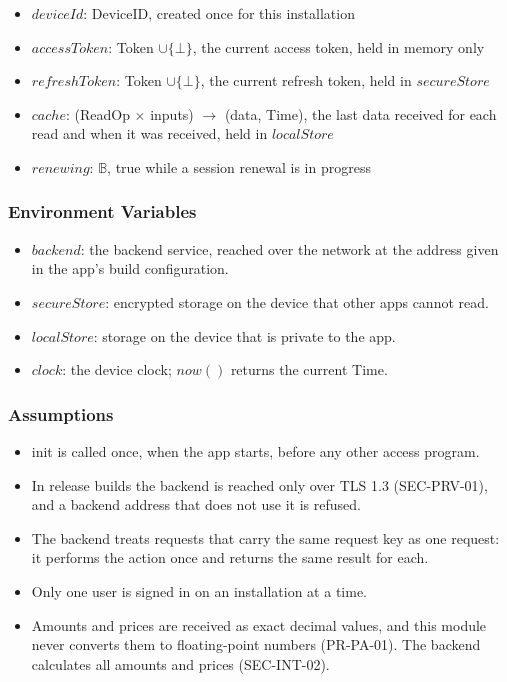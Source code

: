 \documentclass[12pt, titlepage]{article}
\begin{document}
\begin{itemize}
\item $\mathit{deviceId}$: DeviceID, created once for this installation
\item $\mathit{accessToken}$: Token $\cup \{\bot\}$, the current access
  token, held in memory only
\item $\mathit{refreshToken}$: Token $\cup \{\bot\}$, the current refresh
  token, held in $\mathit{secureStore}$
\item $\mathit{cache}$: (ReadOp $\times$ inputs) $\rightarrow$ (data, Time),
  the last data received for each read and when it was received, held in
  $\mathit{localStore}$
\item $\mathit{renewing}$: $\mathbb{B}$, true while a session renewal is in
  progress
\end{itemize}

\subsubsection{Environment Variables}

\begin{itemize}
\item $\mathit{backend}$: the backend service, reached over the network at
  the address given in the app's build configuration.
\item $\mathit{secureStore}$: encrypted storage on the device that other
  apps cannot read.
\item $\mathit{localStore}$: storage on the device that is private to the
  app.
\item $\mathit{clock}$: the device clock; $\mathit{now}()$ returns the
  current Time.
\end{itemize}

\subsubsection{Assumptions}

\begin{itemize}
\item init is called once, when the app starts, before any other access
  program.
\item In release builds the backend is reached only over TLS 1.3
  (SEC-PRV-01), and a backend address that does not use it is refused.
\item The backend treats requests that carry the same request key as one
  request: it performs the action once and returns the same result for each.
\item Only one user is signed in on an installation at a time.
\item Amounts and prices are received as exact decimal values, and this
  module never converts them to floating-point numbers (PR-PA-01). The
  backend calculates all amounts and prices (SEC-INT-02).
\end{itemize}
\end{document}

